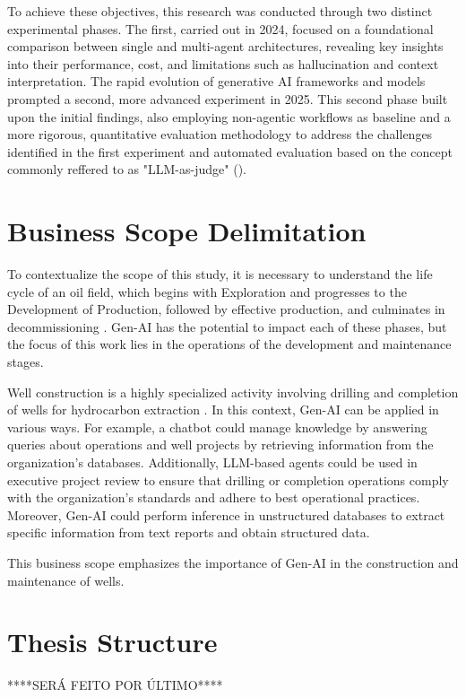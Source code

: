     To achieve these objectives, this research was conducted through two distinct experimental phases. The first, carried out in 2024, focused on a foundational comparison between single and multi-agent architectures, revealing key insights into their performance, cost, and limitations such as hallucination and context interpretation. The rapid evolution of generative AI frameworks and models prompted a second, more advanced experiment in 2025. This second phase built upon the initial findings, also employing non-agentic workflows as baseline and a more rigorous, quantitative evaluation methodology to address the challenges identified in the first experiment and automated evaluation based on the concept commonly reffered to as "LLM-as-judge" (\cite{gu2025surveyllmasajudge}).

\section{Business Scope Delimitation}

    To contextualize the scope of this study, it is necessary to understand the life cycle of an oil field, which begins with Exploration and progresses to the Development of Production, followed by effective production, and culminates in decommissioning \cite{Badiru2016}. Gen-AI has the potential to impact each of these phases, but the focus of this work lies in the operations of the development and maintenance stages.
            
    Well construction is a highly specialized activity involving drilling and completion of wells for hydrocarbon extraction \cite{Thomas2004}. In this context, Gen-AI can be applied in various ways. For example, a chatbot could manage knowledge by answering queries about operations and well projects by retrieving information from the organization's databases. Additionally, LLM-based agents could be used in executive project review to ensure that drilling or completion operations comply with the organization's standards and adhere to best operational practices. Moreover, Gen-AI could perform inference in unstructured databases to extract specific information from text reports and obtain structured data. 
    
    This business scope emphasizes the importance of Gen-AI in the construction and maintenance of wells.

\section{Thesis Structure}

    ****SERÁ FEITO POR ÚLTIMO****
